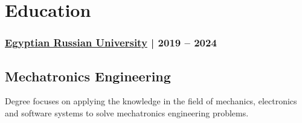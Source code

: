 \section*{Education}
%
%
%
\subsubsection*{\href{https://www.eru.edu.eg/}{Egyptian Russian University} | 2019 -- 2024}
\subsection*{Mechatronics Engineering}
Degree focuses on applying the knowledge in the field of mechanics, electronics
and software systems to solve mechatronics engineering problems.